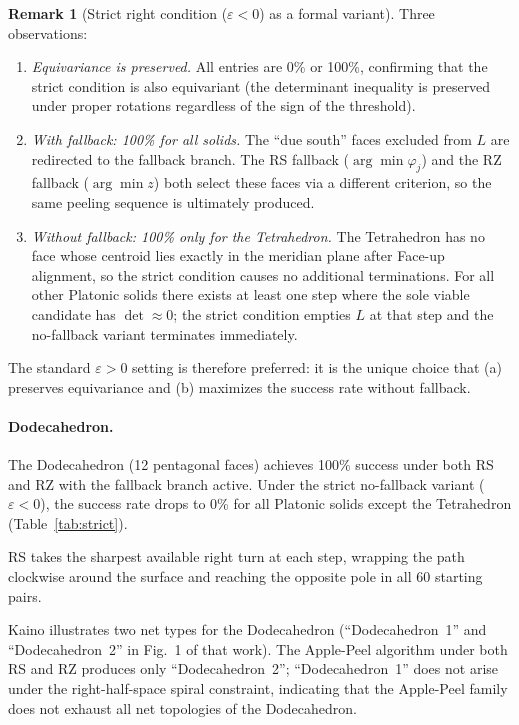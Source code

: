 \documentclass[12pt]{article}
\theoremstyle{definition}
\newtheorem{remark}{Remark}[section]
\begin{document}
\begin{remark}[Strict right condition ($\varepsilon<0$) as a formal variant]
Three observations:
\begin{enumerate}[nosep]
  \item \emph{Equivariance is preserved.}
    All entries are 0\% or 100\%, confirming that the strict condition is
    also equivariant (the determinant inequality is preserved under proper
    rotations regardless of the sign of the threshold).
  \item \emph{With fallback: 100\% for all solids.}
    The ``due south'' faces excluded from $L$ are redirected to the fallback
    branch.  The RS fallback ($\arg\min\varphi_j$) and the RZ fallback
    ($\arg\min z$) both select these faces via a different criterion, so the
    same peeling sequence is ultimately produced.
  \item \emph{Without fallback: 100\% only for the Tetrahedron.}
    The Tetrahedron has no face whose centroid lies exactly in the meridian
    plane after Face-up alignment, so the strict condition causes no
    additional terminations.  For all other Platonic solids there exists at
    least one step where the sole viable candidate has $\det\approx 0$; the
    strict condition empties $L$ at that step and the no-fallback variant
    terminates immediately.
\end{enumerate}
The standard $\varepsilon>0$ setting is therefore preferred: it is the
unique choice that (a) preserves equivariance and (b) maximizes the
success rate without fallback.
\end{remark}

\paragraph{Dodecahedron.}
The Dodecahedron (12 pentagonal faces) achieves 100\% success under
both RS and RZ with the fallback branch active.
Under the strict no-fallback variant ($\varepsilon<0$), the success
rate drops to 0\% for all Platonic solids except the Tetrahedron
(Table~\ref{tab:strict}).

RS takes the sharpest available right turn at each step, wrapping the
path clockwise around the surface and reaching the opposite pole in all
60 starting pairs.

Kaino \cite{Kaino2019} illustrates two net types for the Dodecahedron
(``Dodecahedron~1'' and ``Dodecahedron~2'' in Fig.~1 of that work).
The Apple-Peel algorithm under both RS and RZ produces only
``Dodecahedron~2''; ``Dodecahedron~1'' does not arise under the
right-half-space spiral constraint, indicating that the Apple-Peel
family does not exhaust all net topologies of the Dodecahedron.
\end{document}
